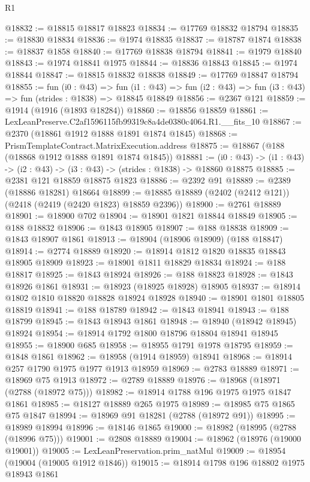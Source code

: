 \begin{lexlean}{R1}
\begin{coremodule}
@18832 := @18815 @18817 @18823
@18834 := @17769 @18832 @18794
@18835 := @18830 @18834
@18836 := @1974 @18835
@18837 := @18787 @1874
@18838 := @18837 @1858
@18840 := @17769 @18838 @18794
@18841 := @1979 @18840
@18843 := @1974 @18841 @1975
@18844 := @18836 @18843
@18845 := @1974 @18844
@18847 := @18815 @18832 @18838
@18849 := @17769 @18847 @18794
@18855 := fun (i0 : @43) =>
  fun (i1 : @43) => fun (i2 : @43) => fun (i3 : @43) => fun (strides : @1838) => @18845 @18849
@18856 := @2367 @121
@18859 := @1914 (@1916 (@1893 @18284))
@18860 := @18856 @18859
@18861 := LexLeanPreserve.C2af1596115fb99319c8a4de0380c4064.R1.__fits_10
@18867 := @2370 (@18861 @1912 @1888 @1891 @1874 @1845)
@18868 := PrismTemplateContract.MatrixExecution.address
@18875 := @18867 (@188 (@18868 @1912 @1888 @1891 @1874 @1845))
@18881 := (i0 : @43) -> (i1 : @43) -> (i2 : @43) -> (i3 : @43) -> (strides : @1838) -> @18860 @18875
@18885 := @2381 @121 @18859 @18875 @1823
@18886 := @2392 @91
@18889 := @2389 (@18886 @18281) @18664
@18899 := @18885 @18889 (@2402 (@2412 @121)) (@2418 (@2419 (@2420 @1823) @18859 @2396))
@18900 := @2761 @18889
@18901 := @18900 @702
@18904 := @18901 @1821 @18844 @18849
@18905 := @188 @18832
@18906 := @1843 @18905
@18907 := @188 @18838
@18909 := @1843 @18907 @1861
@18913 := @18904 (@18906 @18909) (@188 @18847)
@18914 := @2774 @18889
@18920 := @18914 @1812 @1820 @18835 @18843 @18905 @18909
@18923 := @18901 @1811 @18829 @18834
@18924 := @188 @18817
@18925 := @1843 @18924
@18926 := @188 @18823
@18928 := @1843 @18926 @1861
@18931 := @18923 (@18925 @18928) @18905
@18937 := @18914 @1802 @1810 @18820 @18828 @18924 @18928
@18940 := @18901 @1801 @18805 @18819
@18941 := @188 @18789
@18942 := @1843 @18941
@18943 := @188 @18799
@18945 := @1843 @18943 @1861
@18948 := @18940 (@18942 @18945) @18924
@18954 := @18914 @1792 @1800 @18796 @18804 @18941 @18945
@18955 := @18900 @685
@18958 := @18955 @1791 @1978 @18795
@18959 := @1848 @1861
@18962 := @18958 (@1914 @18959) @18941
@18968 := @18914 @257 @1790 @1975 @1977 @1913 @18959
@18969 := @2783 @18889
@18971 := @18969 @75 @1913
@18972 := @2789 @18889
@18976 := @18968 (@18971 (@2788 (@18972 @75)))
@18982 := @18914 @1788 @196 @1975 @1975 @1847 @1861
@18985 := @18127 @18889 @265 @1975
@18989 := @18985 @75 @1865 @75 @1847
@18994 := @18969 @91 @18281 (@2788 (@18972 @91))
@18995 := @18989 @18994
@18996 := @18146 @1865
@19000 := @18982 (@18995 (@2788 (@18996 @75)))
@19001 := @2808 @18889
@19004 := @18962 (@18976 (@19000 @19001))
@19005 := LexLeanPreservation.prim_natMul
@19009 := @18954 (@19004 (@19005 @1912 @1846))
@19015 := @18914 @1798 @196 @18802 @1975 @18943 @1861

\end{coremodule}
\end{lexlean}
